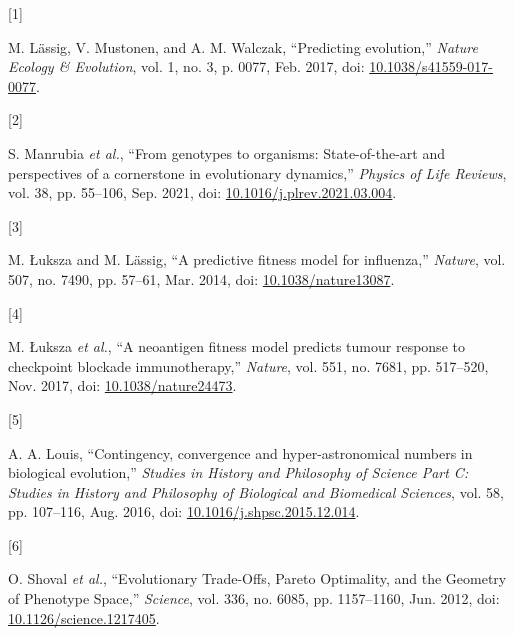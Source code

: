 \documentclass[
]{scrartcl}
\newlength{\cslhangindent}
\newlength{\csllabelwidth}
\newenvironment{CSLReferences}[2] %
 {\begin{list}{}{%
  \setlength{\itemindent}{0pt}
  \setlength{\leftmargin}{0pt}
  \setlength{\parsep}{0pt}
  \ifodd #1
   \setlength{\leftmargin}{\cslhangindent}
   \setlength{\itemindent}{-1\cslhangindent}
  \fi
  \setlength{\itemsep}{#2\baselineskip}}}
 {\end{list}}
\newcommand{\CSLLeftMargin}[1]{\parbox[t]{\csllabelwidth}{\strut#1\strut}}
\newcommand{\CSLRightInline}[1]{\parbox[t]{\linewidth - \csllabelwidth}{\strut#1\strut}}
\begin{document}
\begin{refsection}
\begin{figure}
\end{figure}%

\printbibliography[title={Reference},
section=\therefsection]
\end{refsection}

\label{refs}
\begin{CSLReferences}{0}{0}
\CSLLeftMargin{{[}1{]} }%
\CSLRightInline{M. Lässig, V. Mustonen, and A. M. Walczak, {``Predicting
evolution,''} \emph{Nature Ecology \& Evolution}, vol. 1, no. 3, p.
0077, Feb. 2017, doi:
\href{https://doi.org/10.1038/s41559-017-0077}{10.1038/s41559-017-0077}.}

\CSLLeftMargin{{[}2{]} }%
\CSLRightInline{S. Manrubia \emph{et al.}, {``From genotypes to
organisms: {State-of-the-art} and perspectives of a cornerstone in
evolutionary dynamics,''} \emph{Physics of Life Reviews}, vol. 38, pp.
55--106, Sep. 2021, doi:
\href{https://doi.org/10.1016/j.plrev.2021.03.004}{10.1016/j.plrev.2021.03.004}.}

\CSLLeftMargin{{[}3{]} }%
\CSLRightInline{M. Łuksza and M. Lässig, {``A predictive fitness model
for influenza,''} \emph{Nature}, vol. 507, no. 7490, pp. 57--61, Mar.
2014, doi:
\href{https://doi.org/10.1038/nature13087}{10.1038/nature13087}.}

\CSLLeftMargin{{[}4{]} }%
\CSLRightInline{M. Łuksza \emph{et al.}, {``A neoantigen fitness model
predicts tumour response to checkpoint blockade immunotherapy,''}
\emph{Nature}, vol. 551, no. 7681, pp. 517--520, Nov. 2017, doi:
\href{https://doi.org/10.1038/nature24473}{10.1038/nature24473}.}

\CSLLeftMargin{{[}5{]} }%
\CSLRightInline{A. A. Louis, {``Contingency, convergence and
hyper-astronomical numbers in biological evolution,''} \emph{Studies in
History and Philosophy of Science Part C: Studies in History and
Philosophy of Biological and Biomedical Sciences}, vol. 58, pp.
107--116, Aug. 2016, doi:
\href{https://doi.org/10.1016/j.shpsc.2015.12.014}{10.1016/j.shpsc.2015.12.014}.}

\CSLLeftMargin{{[}6{]} }%
\CSLRightInline{O. Shoval \emph{et al.}, {``Evolutionary {Trade-Offs},
{Pareto Optimality}, and the {Geometry} of {Phenotype Space},''}
\emph{Science}, vol. 336, no. 6085, pp. 1157--1160, Jun. 2012, doi:
\href{https://doi.org/10.1126/science.1217405}{10.1126/science.1217405}.}


\end{CSLReferences}
\end{document}
